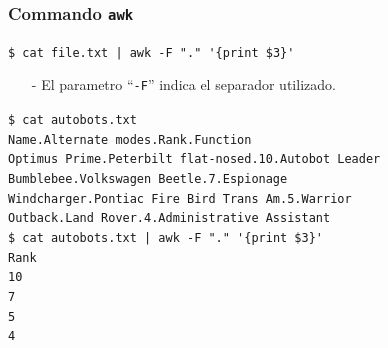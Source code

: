 \documentclass{beamer}
\begin{document}
\begin{frame}[fragile,t]
    \frametitle{Commando \texttt{awk}}
    \begin{block}{\vspace*{-3ex}}
    \texttt{\$}\verb: cat file.txt | awk -F "." '{print $3}':
    \vspace*{0.5ex}
    \end{block}
    \begin{itemize}
    \item[-] El parametro ``\verb|-F|'' indica el separador utilizado.
    \end{itemize}
    \pause
    \vspace{-0.5cm}
    \begin{block}{\vspace*{-3ex}}
    \small
    \texttt{\$}\verb: cat autobots.txt:\\
    \verb:Name.Alternate modes.Rank.Function:\\
    \verb:Optimus Prime.Peterbilt flat-nosed.10.Autobot Leader:\\
    \verb:Bumblebee.Volkswagen Beetle.7.Espionage:\\
    \verb:Windcharger.Pontiac Fire Bird Trans Am.5.Warrior:\\
    \verb:Outback.Land Rover.4.Administrative Assistant:\\
    \vspace{0.2cm}
    \texttt{\$}\verb: cat autobots.txt | awk -F "." '{print $3}':\\
    \verb:Rank:\\
    \verb:10:\\
    \verb:7:\\
    \verb:5:\\
    \verb:4:\\
    \vspace*{0.5ex}
    \end{block}
\end{frame}
\end{document}
